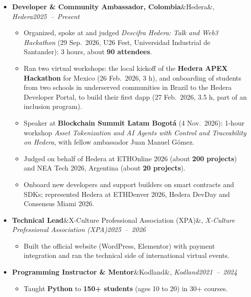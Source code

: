 \documentclass[a4paper,10pt]{article}
\newcommand{\entry}[3]{\textbf{#1}\ifx&#2&\else, \textit{#2}\fi \hfill \mbox{\textit{#3}}}
\begin{document}
\begin{itemize}
    \item \entry{Developer \& Community Ambassador, Colombia}{Hedera}{2025 -- Present}
        \begin{itemize}
            \item Organized, spoke at and judged \textit{Descifra Hedera: Talk and Web3
                Hackathon} (29 Sep.\ 2026, U26 Fest, Universidad Industrial de Santander):
                3 hours, about \textbf{90 attendees}.
            \item Ran two virtual workshops: the local kickoff of the \textbf{Hedera APEX
                Hackathon} for Mexico (26 Feb.\ 2026, 3 h), and onboarding of students from two
                schools in underserved communities in Brazil to the Hedera Developer Portal,
                to build their first dapp (27 Feb.\ 2026, 3.5 h, part of an inclusion program).
            \item Speaker at \textbf{Blockchain Summit Latam Bogot\'a} (4 Nov.\ 2026): 1-hour
                workshop \textit{Asset Tokenization and AI Agents with Control and Traceability on
                Hedera}, with fellow ambassador Juan Manuel G\'omez.
            \item Judged on behalf of Hedera at ETHOnline 2026 (about \textbf{200 projects}) and
                NEA Tech 2026, Argentina (about \textbf{20 projects}).
            \item Onboard new developers and support builders on smart contracts and SDKs;
                represented Hedera at ETHDenver 2026, Hedera DevDay and Consensus Miami 2026.
        \end{itemize}

    \item \entry{Technical Lead}{X-Culture Professional Association (XPA)}{2025 -- 2026}
        \begin{itemize}
            \item Built the official website (WordPress, Elementor) with payment integration and
                ran the technical side of international virtual events.
        \end{itemize}

    \item \entry{Programming Instructor \& Mentor}{Kodland}{2021 -- 2024}
        \begin{itemize}
            \item Taught \textbf{Python} to \textbf{150+ students} (ages 10 to 20) in 30+ courses.
        \end{itemize}
\end{itemize}
\end{document}
